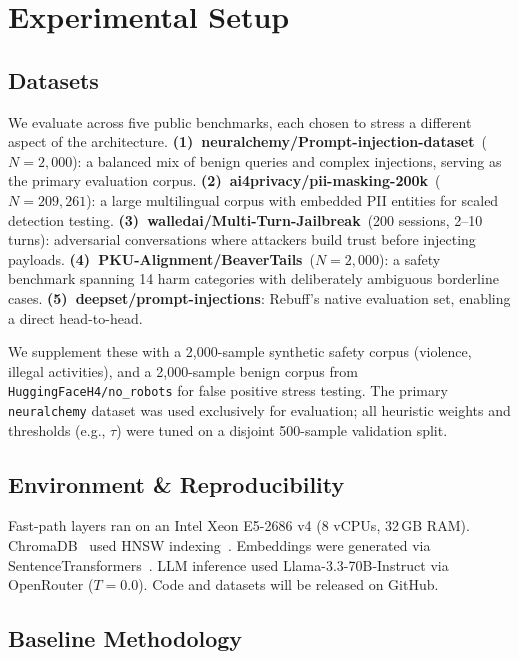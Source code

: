 \documentclass[conference]{IEEEtran}
\begin{document}
\section{Experimental Setup}

\subsection{Datasets}

We evaluate across five public benchmarks, each chosen to stress a
different aspect of the architecture.
\textbf{(1)~neuralchemy/Prompt-injection-dataset}~($N{=}2{,}000$):
a balanced mix of benign queries and complex injections, serving as
the primary evaluation corpus.
\textbf{(2)~ai4privacy/pii-masking-200k}~($N{=}209{,}261$): a
large multilingual corpus with embedded PII entities for scaled
detection testing.
\textbf{(3)~walledai/Multi-Turn-Jailbreak}~(200 sessions, 2--10
turns): adversarial conversations where attackers build trust before
injecting payloads.
\textbf{(4)~PKU-Alignment/BeaverTails}~($N{=}2{,}000$): a safety
benchmark spanning 14 harm categories with deliberately ambiguous
borderline cases.
\textbf{(5)~deepset/prompt-injections}: Rebuff's native evaluation
set, enabling a direct head-to-head.

We supplement these with a 2{,}000-sample
synthetic safety corpus (violence, illegal activities), and a
2{,}000-sample benign corpus from \texttt{HuggingFaceH4/no\_robots}
for false positive stress testing. The primary \texttt{neuralchemy}
dataset was used exclusively for evaluation; all heuristic weights
and thresholds (e.g., $\tau$) were tuned on a disjoint 500-sample
validation split.

\subsection{Environment \& Reproducibility}

Fast-path layers ran on an Intel Xeon E5-2686 v4 (8 vCPUs,
32\,GB RAM). ChromaDB~\cite{chromadb} used HNSW indexing~\cite{malkov2020hnsw}.
Embeddings were generated via SentenceTransformers~\cite{reimers2019sbert}.
LLM inference used Llama-3.3-70B-Instruct via OpenRouter ($T{=}0.0$).
Code and datasets will be released on GitHub.

\subsection{Baseline Methodology}
\end{document}
